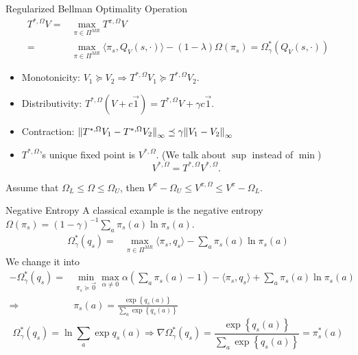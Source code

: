 \documentclass{beamer}
\begin{document}
\begin{frame}[t]{Regularized Bellman Optimality Operation}
        \begin{align*}
            T^{*,\Omega}V =& \max_{\pi \in \Pi^{MR}} T^{\pi,\Omega}V\\
            =& \max_{\pi \in \Pi^{MR}} \langle \pi_s, Q_V(s, \cdot) \rangle - (1 - \lambda)\Omega(\pi_s)
            = \Omega^{*}_{\gamma}( Q_{V}(s,\cdot))
        \end{align*}
        \begin{itemize}
            \item Monotonicity: $ V_1 \succeq V_2 \Rightarrow T^{*,\Omega} V_1 \succeq T^{*, \Omega} V_2 $.\\
            \item Distributivity: $ T^{*,\Omega}(V + c \vec{1}) = T^{*, \Omega}V + \gamma c \vec{1} $.
            \item Contraction: $ {\Arrowvert T^{*, \Omega}V_1 - T^{*, \Omega}V_2 \Arrowvert}_\infty \preceq \gamma {\Arrowvert V_1 - V_2 \Arrowvert}_\infty $
            \item $ T^{*, \Omega} $'s unique fixed point is $ V^{*,\Omega} $. (We talk about $ \sup $ instead of $ \min $)\\
                \[
                    V^{*,\Omega} = T^{*, \Omega} V^{*, \Omega}.
                \]
        \end{itemize}
        Assume that $ \Omega_L \le \Omega \le \Omega_U $, then $ V^{\pi} - \Omega_U \le V^{\pi, \Omega} \le V^{\pi} - \Omega_L $.
\end{frame}

\begin{frame}[t]{Negative Entropy}
   A classical example is the negative entropy $ \Omega(\pi_s) = {(1 - \gamma)}^{-1}\sum^{}_{a} \pi_s(a) \ln \pi_s(a) $.
\begin{align*}
    \Omega^{*}_{\gamma}(q_s) =& \max_{\pi \in \Pi^{MR}} \langle \pi_s, q_s \rangle - \sum^{}_{a} \pi_s(a) \ln \pi_s(a)
\end{align*}
We change it into 
\begin{align*}
    -\Omega^{*}_{\gamma}(q_s) =& \min_{\pi_{s} \succeq \vec{0}} \max_{\alpha \ne 0} \alpha \left(\sum^{}_{a} \pi_s(a) - 1 \right)-\langle \pi_s, q_s \rangle + \sum^{}_{a} \pi_s(a) \ln \pi_s(a)\\
    \Rightarrow& \pi_s(a) = \frac{\exp \left\{q_{s}(a) \right\}}{\sum^{}_{a} \exp\left\{ q_s(a) \right\}} 
\end{align*}
\[
    \Omega^{*}_{\gamma}(q_s) = \ln \sum^{}_{a} \exp q_s(a) \Rightarrow \nabla \Omega^*_{\gamma}(q_s) = \frac{\exp\left\{ q_s(a) \right\}}{ \sum^{}_{a} \exp\left\{ q_s(a) \right\}} = \pi^*_s(a)
\]
\end{frame}
\end{document}
